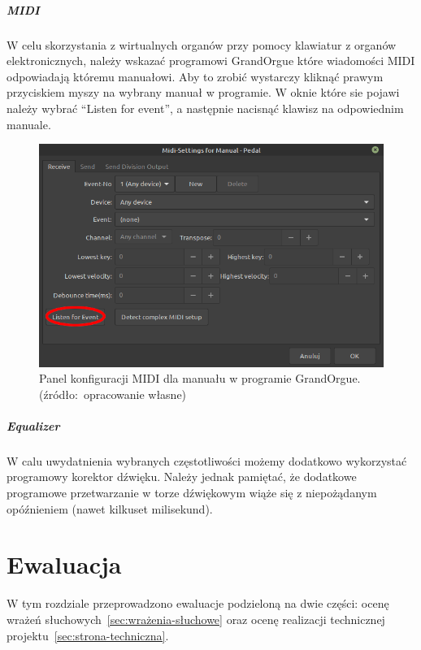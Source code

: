 \documentclass[11pt]{report}
\begin{document}
    \paragraph{MIDI}
    W celu skorzystania z wirtualnych organów przy pomocy klawiatur z organów elektronicznych,
    należy wskazać programowi GrandOrgue które wiadomości MIDI odpowiadają któremu manuałowi.
    Aby to zrobić wystarczy kliknąć prawym przyciskiem myszy na wybrany manuał w programie.
    W oknie które sie pojawi należy wybrać ``Listen for event'', a następnie nacisnąć klawisz na odpowiednim manuale.
    \begin{figure}[!ht]
        \centering
        \includegraphics[width=\linewidth]{fig/midiR.png}
        \caption{Panel konfiguracji MIDI dla manuału w programie GrandOrgue. (źródło:~opracowanie własne)}
        \label{fig:midi}
    \end{figure}

    \paragraph{Equalizer}
    W calu uwydatnienia wybranych częstotliwości możemy dodatkowo wykorzystać programowy korektor dźwięku.
    Należy jednak pamiętać, że dodatkowe programowe przetwarzanie w torze dźwiękowym wiąże się z niepożądanym opóźnieniem (nawet kilkuset milisekund).


    \chapter{Ewaluacja}
    W tym rozdziale przeprowadzono ewaluacje podzieloną na dwie części: ocenę wrażeń słuchowych~\ref{sec:wrażenia-słuchowe} oraz ocenę realizacji technicznej projektu~\ref{sec:strona-techniczna}.
\end{document}

